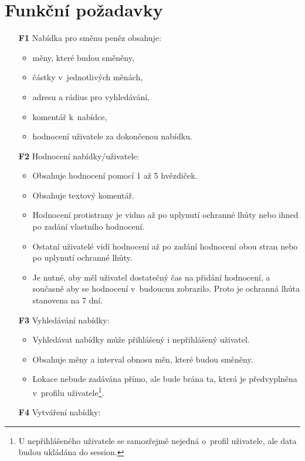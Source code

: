 \section{Funkční požadavky}
\begin{itemize}
    \item[\textbf{F1}] Nabídka pro směnu peněz obsahuje:
        \begin{itemize}
            \item měny, které budou směněny,
            \item částky v~jednotlivých měnách,
            \item adresu a rádius pro vyhledávání,
            \item komentář k~nabídce,
            \item hodnocení uživatele za dokončenou nabídku.
        \end{itemize}
    \item[\textbf{F2}] Hodnocení nabídky/uživatele:
        \begin{itemize}
            \item Obsahuje hodnocení pomocí 1 až 5 hvězdiček.
            \item Obsahuje textový komentář.
            \item Hodnocení protistrany je vidno až po uplynutí ochranné lhůty nebo ihned po zadání vlastního hodnocení.
            \item Ostatní uživatelé vidí hodnocení až po zadání hodnocení obou stran nebo po uplynutí ochranné lhůty.
            \item Je nutné, aby měl uživatel dostatečný čas na přidání hodnocení, a současně aby se hodnocení v~budoucnu zobrazilo. Proto je ochranná lhůta stanovena na 7 dní.
        \end{itemize}
    \item[\textbf{F3}] Vyhledávání nabídky:
        \begin{itemize}
            \item Vyhledávat nabídky může přihlášený i nepřihlášený uživatel.
            \item Obsahuje měny a interval obnosu měn, které budou směněny.
            \item Lokace nebude zadávána přímo, ale bude brána ta, která je předvyplněna v~profilu uživatele\footnote{U nepřihlášeného uživatele se samozřejmě nejedná o~profil uživatele, ale data budou ukládána do session.}.
        \end{itemize}
    \item[\textbf{F4}] Vytváření nabídky:

\end{itemize}
